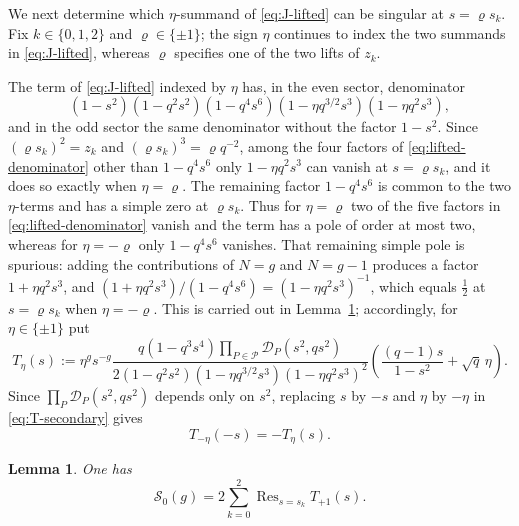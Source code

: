 \documentclass[a4paper,reqno]{amsart}
\numberwithin{equation}{section}
\newtheorem{lemma}[theorem]{Lemma}
\theoremstyle{remark}
\theoremstyle{definition}
\begin{document}
We next determine which $\eta$-summand of \eqref{eq:J-lifted} can be
singular at $s=\varrho s_k$. Fix $k\in\{0,1,2\}$ and $\varrho\in\{\pm1\}$;
the sign $\eta$ continues to index the two summands in
\eqref{eq:J-lifted}, whereas $\varrho$ specifies one of the two lifts of
$z_k$.

The term of \eqref{eq:J-lifted} indexed by $\eta$ has, in the even sector,
denominator
\begin{equation}\label{eq:lifted-denominator}
(1-s^2)(1-q^2s^2)(1-q^4s^6)(1-\eta q^{3/2}s^3)(1-\eta q^2s^3),
\end{equation}
and in the odd sector the same denominator without the factor $1-s^2$.
Since $(\varrho s_k)^2=z_k$ and $(\varrho s_k)^3=\varrho q^{-2}$, among the
four factors of \eqref{eq:lifted-denominator} other than $1-q^4s^6$ only
$1-\eta q^2s^3$ can vanish at $s=\varrho s_k$, and it does so exactly when
$\eta=\varrho$. The remaining
factor $1-q^4s^6$ is common to the two $\eta$-terms and has a simple zero at
$\varrho s_k$. Thus for $\eta=\varrho$ two of the five factors in
\eqref{eq:lifted-denominator} vanish and the term has a pole of order at most
two, whereas for $\eta=-\varrho$ only $1-q^4s^6$ vanishes. That remaining
simple pole is spurious: adding the contributions of $N=g$ and $N=g-1$
produces a factor $1+\eta q^2s^3$, and
$(1+\eta q^2s^3)/(1-q^4s^6)=(1-\eta q^2s^3)^{-1}$, which equals $\tfrac12$ at
$s=\varrho s_k$ when $\eta=-\varrho$. This is carried out in
Lemma~\ref{lem:mirror-cancellation-even}; accordingly, for
$\eta\in\{\pm1\}$ put
\begin{equation}\label{eq:T-secondary}
T_\eta(s)
:=
\eta^g s^{-g}
\frac{q(1-q^3s^4)\prod_{P\in\mathcal P}\mathcal D_P(s^2,qs^2)}
{2(1-q^2s^2)(1-\eta q^{3/2}s^3)
(1-\eta q^2s^3)^2}
\left(
\frac{(q-1)s}{1-s^2}+\sqrt q\,\eta
\right).
\end{equation}
Since $\prod_{P}\mathcal D_P(s^2,qs^2)$ depends only on $s^2$, replacing $s$
by $-s$ and $\eta$ by $-\eta$ in \eqref{eq:T-secondary} gives
\begin{equation}\label{eq:T-mirror}
T_{-\eta}(-s)=-T_\eta(s).
\end{equation}

\begin{lemma}
\label{lem:mirror-cancellation-even}
One has
\begin{equation}\label{eq:S0-three-residues}
\mathcal S_0(g)
=
2\sum_{k=0}^{2}
\operatorname{Res}_{s=s_k}T_{+1}(s).
\end{equation}
\end{lemma}
\end{document}
